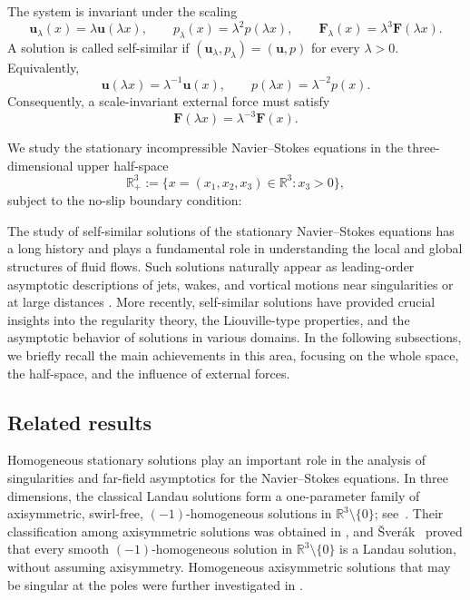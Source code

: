 \documentclass{amsart}
\newcommand{\lm}{\lambda}
\newcommand{\Bu}{{\boldsymbol{u}}}
\newcommand{\BF}{{\boldsymbol{F}}}
\begin{document}
The system is invariant under the scaling
\[
\Bu_\lambda(x)=\lambda\Bu(\lambda x),
\qquad
p_\lambda(x)=\lambda^2p(\lambda x),
\qquad
\BF_\lambda(x)=\lambda^3\BF(\lambda x).
\]
A solution is called self-similar if
$(\Bu_\lambda,p_\lambda)=(\Bu,p)$ for every $\lambda>0$.
Equivalently,
\[
\Bu(\lambda x)=\lambda^{-1}\Bu(x),
\qquad
p(\lambda x)=\lambda^{-2}p(x).
\]
Consequently, a scale-invariant external force must satisfy
\[
\BF(\lambda x)=\lambda^{-3}\BF(x).
\]






We study the stationary incompressible Navier--Stokes equations
in the three-dimensional upper half-space
\[
\mathbb R^3_+:=\{x=(x_1,x_2,x_3)\in\mathbb R^3:x_3>0\},
\]
subject to the no-slip boundary condition:



The study of self-similar solutions of the stationary Navier--Stokes equations has a long history and plays a fundamental role in understanding the local and global structures of fluid flows. Such solutions naturally appear as leading-order asymptotic descriptions of jets, wakes, and vortical motions near singularities or at large distances \cite{DG00, DI17, GPS96, JS26, KS11, MT12}. 
More recently, self-similar solutions have provided crucial insights into the regularity theory, the Liouville-type properties, and the asymptotic behavior of solutions in various domains. In the following subsections, we briefly recall the main achievements in this area, focusing on the whole space, the half-space, and the influence of external forces.

\subsection{Related results}

Homogeneous stationary solutions play an important role in the
analysis of singularities and far-field asymptotics for the
Navier--Stokes equations. In three dimensions, the classical Landau
solutions form a one-parameter family of axisymmetric, swirl-free,
$(-1)$-homogeneous solutions in
$\mathbb R^3\setminus\{0\}$; see~\cite{Landau44}.
Their classification among axisymmetric solutions was obtained in
\cite{TianXin98,CK2004}, and \v{S}ver\'ak~\cite{Sverak11} proved
that every smooth $(-1)$-homogeneous solution in
$\mathbb R^3\setminus\{0\}$ is a Landau solution, without assuming
axisymmetry. Homogeneous axisymmetric solutions that may be singular
at the poles were further investigated in
\cite{LLY18I,LLY18II,LLY19III}.
\end{document}
